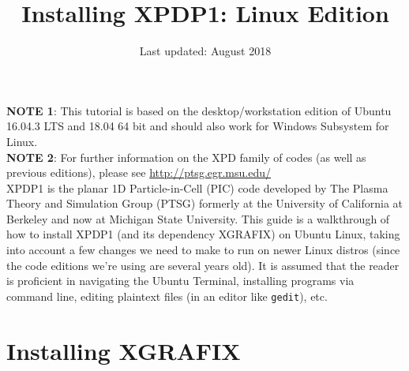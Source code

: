\documentclass{article}
\title{Installing XPDP1: Linux Edition}
\author{}
\date{Last updated: August 2018}
\begin{document}
	\maketitle
	
	\noindent \textbf{NOTE 1}: This tutorial is based on the desktop/workstation edition of Ubuntu 16.04.3 LTS and 18.04 64 bit and should also work for Windows Subsystem for Linux. \\
	\textbf{NOTE 2}: For further information on the XPD family of codes (as well as previous editions), please see \url{http://ptsg.egr.msu.edu/} \\
	
	\noindent XPDP1 is the planar 1D Particle-in-Cell (PIC) code developed by The Plasma Theory and Simulation Group (PTSG) formerly at the University of California at Berkeley and now at Michigan State University. This guide is a walkthrough of how to install XPDP1 (and its dependency XGRAFIX) on Ubuntu Linux, taking into account a few changes we need to make to run on newer Linux distros (since the code editions we're using are several years old). It is assumed that the reader is proficient in navigating the Ubuntu Terminal, installing programs via command line, editing plaintext files (in an editor like \verb|gedit|), etc.
	
	\section{Installing XGRAFIX}
	
\end{document}
